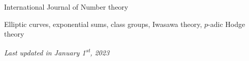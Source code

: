 \documentclass[11pt]{article}
\begin{document}
\begin{cvlist}
\item International Journal of Number theory
\end{cvlist}


\begin{cvlist}
\item Elliptic curves, exponential sums, class groups, Iwasawa theory, $p$-adic Hodge theory
\end{cvlist}


\medskip\emph{Last updated in January 1\textsuperscript{st}, 2023}
\end{document}
